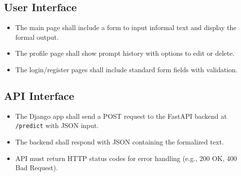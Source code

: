\subsection{User Interface}
\begin{itemize}
  \item The main page shall include a form to input informal text and display the formal output.
  \item The profile page shall show prompt history with options to edit or delete.
  \item The login/register pages shall include standard form fields with validation.
\end{itemize}

\subsection{API Interface}
\begin{itemize}
  \item The Django app shall send a POST request to the FastAPI backend at \texttt{/predict} with JSON input.
  \item The backend shall respond with JSON containing the formalized text.
  \item API must return HTTP status codes for error handling (e.g., 200 OK, 400 Bad Request).
\end{itemize}


